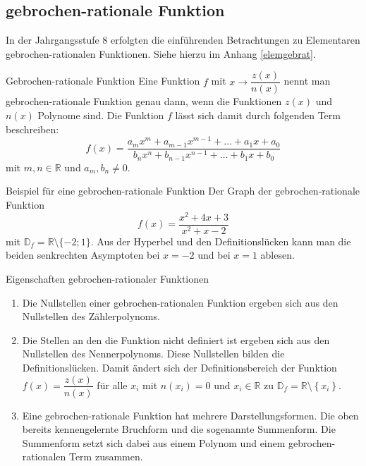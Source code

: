     \subsection{gebrochen-rationale Funktion}
In der Jahrgangsstufe 8 erfolgten die einführenden Betrachtungen zu Elementaren gebrochen-rationalen Funktionen. Siehe hierzu im Anhang \ref{elemgebrat}.
 \begin{defi}{Gebrochen-rationale Funktion}{}
Eine Funktion $f$ mit $x\longrightarrow \dfrac{z(x)}{n(x)}$ nennt man gebrochen-rationale Funktion genau dann, wenn die Funktionen $z(x)$ und $n(x)$ Polynome sind. Die Funktion $f$ lässt sich damit durch folgenden Term beschreiben:$$f(x) = \dfrac{a_mx^m + a_{m-1}x^{m-1} + \ldots + a_1 x +a_0}{b_n x^n + b_{n-1}x^{n-1} + \ldots + b_1 x + b_0}$$ mit $m,n \in \mathds{R}$ und $a_m , b_n \neq 0$.
 \end{defi}
 \begin{bsp}{Beispiel für eine gebrochen-rationale Funktion}{} 
Der Graph der gebrochen-rationale Funktion  $$f(x)= \dfrac{x^2+4x+3}{x^2+x-2}$$ mit $\mathds{D}_f = \mathds{R}\setminus \{-2;1\}$. Aus der Hyperbel und den Definitionslücken kann man die beiden senkrechten Asymptoten bei $x=-2$ und bei $x=1$ ablesen.  
\begin{center}
\end{center}
\end{bsp}
 \begin{merke}{Eigenschaften gebrochen-rationaler Funktionen}{}
     \begin{enumerate}
         \item Die Nullstellen einer gebrochen-rationalen Funktion ergeben sich aus den Nullstellen des Zählerpolynoms.
         \item Die Stellen an den die Funktion nicht definiert ist ergeben sich aus den Nullstellen des Nennerpolynoms. Diese Nullstellen bilden die Definitionslücken. Damit ändert sich der Definitionsbereich der Funktion $f(x)= \dfrac{z(x)}{n(x)}$  für alle $x_i$ mit $n(x_i) = 0$ und $x_i \in \mathds{R}$ zu $\mathds{D}_f = \mathds{R}\setminus \left\{x_i\right\}$. 
     \item Eine gebrochen-rationale Funktion hat mehrere Darstellungsformen. Die oben bereits kennengelernte Bruchform und die sogenannte Summenform. Die Summenform setzt sich dabei aus einem Polynom und einem gebrochen-rationalen Term zusammen.
     \end{enumerate}
 \end{merke}
